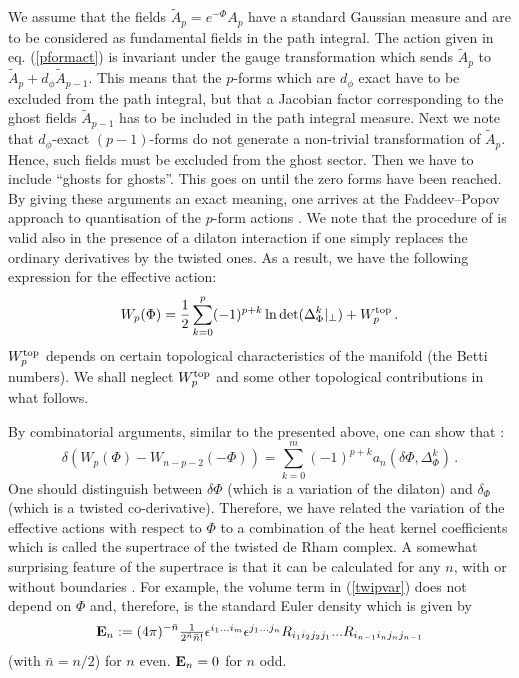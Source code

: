 We assume that the fields $\tilde A_p=e^{-\Phi}A_p$ have a standard
Gaussian measure and are to be considered as fundamental fields in the
path integral. The action given in eq. (\ref{pformact}) is invariant
under the gauge transformation which sends $\tilde A_p$ to $\tilde A_p +
d_\phi \tilde A_{p-1}$. This means that the $p$-forms which are
$d_\phi$ exact have to be excluded from the path integral, but that
a Jacobian factor corresponding to the ghost fields $\tilde A_{p-1}$
has to be included in the path integral measure. Next we note that
$d_\phi$-exact $(p-1)$-forms do not generate a non-trivial transformation
of $\tilde A_p$. Hence, such fields must be excluded from the ghost
sector. Then we have to include ``ghosts for ghosts''. This goes on
until the zero forms have been reached. By giving these arguments
an exact meaning, one arrives at the Faddeev--Popov approach to
quantisation of the $p$-form actions 
\cite{Duff:1980qv,Siegel:1980jj,Obukhov:1982dt,Barbon:1995zh}. 
We note that the procedure of 
\cite{Obukhov:1982dt,Barbon:1995zh} is valid also in the
presence of a dilaton interaction if one simply replaces the ordinary
derivatives by the twisted ones. As a result, we have the following 
expression for the
effective action: 
\begin{equation}
W_p(\Phi )=\frac 12 \sum_{k=0}^p (-1)^{p+k} \ln \det (\Delta^k_\Phi
\vert_{\perp}) +W_p^{\rm top} \,.\label{twiefa}
\end{equation}
$W_p^{\rm top}$ depends on certain topological characteristics
of the manifold (the Betti numbers). We shall neglect $W_p^{\rm top}$
and some other topological contributions 
in what follows.

By combinatorial arguments, similar to the presented above,
one can show that \cite{Gilkey:2002qd}:
\begin{equation}
\delta \left( W_p(\Phi )-W_{n-p-2}(-\Phi )\right)=
\sum_{k=0}^m (-1)^{p+k}  a_n(\delta\Phi,\Delta_{\Phi}^k)\,.
\label{twipvar}
\end{equation}
One should distinguish between $\delta \Phi$ (which is a variation
of the dilaton) and $\delta_\Phi$ (which is a twisted co-derivative).
Therefore, we have related the variation of the effective actions
with respect to $\Phi$ to a combination of the heat kernel coefficients
which is called the supertrace of the twisted
de Rham complex. A somewhat surprising feature of the supertrace 
is that it can be calculated for any $n$, with or without boundaries
\cite{Gilkey:2002qd}. For example, the volume term in (\ref{twipvar})
does not depend on $\Phi$ and, therefore, is the standard
Euler density which is given by
\begin{equation}
{\rm \bf E}_n:=(4\pi)^{-\bar n}\textstyle\frac1{2^{\bar n}\bar n!}
\epsilon^{i_1...i_m}\epsilon^{j_1...j_n}R_{i_1i_2j_2j_1}...
R_{i_{n-1}i_nj_{n}j_{n-1}}
\label{Pengui}\end{equation}
(with $\bar n=n/2$) for $n$ even. ${\rm \bf E}_n=0$ for $n$ odd.

